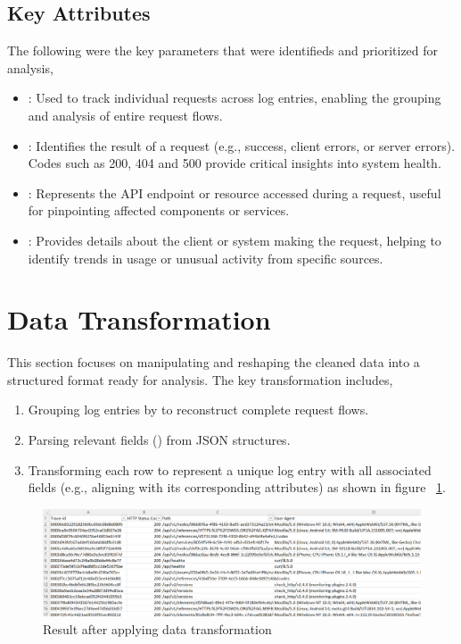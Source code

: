 \subsection{Key Attributes}
The following were the key parameters that were identifieds and prioritized for analysis,
\begin{itemize}
	\item {}: Used to track individual requests across log entries, enabling the grouping and analysis of entire request flows.
	\item {}: Identifies the result of a request (e.g., success, client errors, or server errors). Codes such as 200, 404 and 500 provide critical insights into system health.
	\item {}: Represents the API endpoint or resource accessed during a request, useful for pinpointing affected components or services.
	\item {}: Provides details about the client or system making the request, helping to identify trends in usage or unusual activity from specific sources.
\end{itemize}

\section{Data Transformation}

This section focuses on manipulating and reshaping the cleaned data into a structured format ready for analysis. The key transformation includes,

\begin{enumerate}
	\item Grouping log entries by  to reconstruct complete request flows.
	\item Parsing relevant fields () from JSON structures.
	\item Transforming each row to represent a unique log entry with all associated fields (e.g., aligning  with its corresponding attributes) as shown in figure ~\ref{DataTrans}.
\end{enumerate}

\begin{figure}
	\begin{center}
		\includegraphics[width=0.9\linewidth]{Images/DataTransformation.png}
		\caption{Result after applying data transformation}
		\label{DataTrans} 
	\end{center}
\end{figure}

